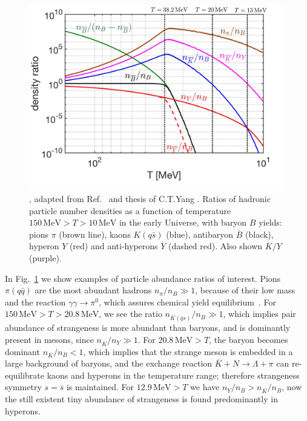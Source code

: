 \begin{figure}[bt]
\centering
\includegraphics[width=\textwidth]{./plots/Meson_Baryon_density_ratio_C.jpg}
\caption{, adapted from Ref.~\cite{Yang:2021bko} and thesis of C.T.Yang \cite{Yang:2024ret}. Ratios of hadronic particle number densities as a function of temperature $150\,\mathrm{MeV}> T>10\,\mathrm{MeV}$ in the early Universe, with baryon $B$ yields: pions $\pi$ (brown line), kaons $K( q\bar s)$ (blue), antibaryon $\overline B$ (black), hyperon $Y$ (red) and anti-hyperons $\overline Y$ (dashed red). Also shown $\overline K/Y$(purple).}
\label{EquilibPartRatiosFig}
\end{figure}

In Fig.~\ref{EquilibPartRatiosFig} we show examples of particle abundance ratios of interest. %
Pions $\pi(q\bar q)$ are the most abundant hadrons $n_\pi/n_B\gg1$, because of their low mass and the reaction $\gamma\gamma\rightarrow\pi^0$, which assures chemical yield equilibrium~\cite{Kuznetsova:2008jt}. For $150\,\mathrm{MeV}>T>20.8\,\mathrm{MeV}$, we see the ratio $n_{{\overline K}(\bar q s)}/n_B\gg1$, which implies pair abundance of strangeness is more abundant than baryons, and is dominantly present in mesons, since $n_{\overline K}/n_Y\gg1$. 
For $20.8\,\mathrm{MeV}>T$, the baryon becomes dominant $n_{\overline K}/n_B<1$, which implies that the strange meson is embedded in a large background of baryons, and the exchange reaction $\overline{K}+N\rightarrow \Lambda+\pi$ can re-equilibrate kaons and hyperons in the temperature range; therefore strangeness symmetry $s=\bar s$ is maintained. For $12.9\,\mathrm{MeV}>T$ we have $n_Y/n_B>n_{\overline K}/n_B$, now the still existent tiny abundance of strangeness is found predominantly in hyperons.



